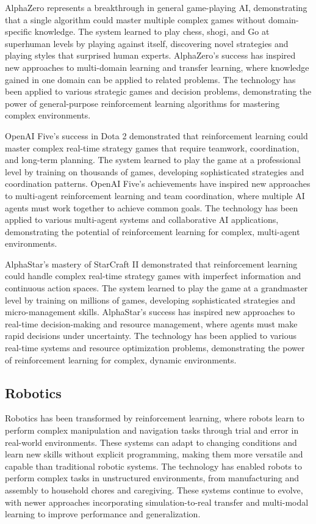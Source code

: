 AlphaZero represents a breakthrough in general game-playing AI, demonstrating that a single algorithm could master multiple complex games without domain-specific knowledge. The system learned to play chess, shogi, and Go at superhuman levels by playing against itself, discovering novel strategies and playing styles that surprised human experts. AlphaZero's success has inspired new approaches to multi-domain learning and transfer learning, where knowledge gained in one domain can be applied to related problems. The technology has been applied to various strategic games and decision problems, demonstrating the power of general-purpose reinforcement learning algorithms for mastering complex environments.

OpenAI Five's success in Dota 2 demonstrated that reinforcement learning could master complex real-time strategy games that require teamwork, coordination, and long-term planning. The system learned to play the game at a professional level by training on thousands of games, developing sophisticated strategies and coordination patterns. OpenAI Five's achievements have inspired new approaches to multi-agent reinforcement learning and team coordination, where multiple AI agents must work together to achieve common goals. The technology has been applied to various multi-agent systems and collaborative AI applications, demonstrating the potential of reinforcement learning for complex, multi-agent environments.

AlphaStar's mastery of StarCraft II demonstrated that reinforcement learning could handle complex real-time strategy games with imperfect information and continuous action spaces. The system learned to play the game at a grandmaster level by training on millions of games, developing sophisticated strategies and micro-management skills. AlphaStar's success has inspired new approaches to real-time decision-making and resource management, where agents must make rapid decisions under uncertainty. The technology has been applied to various real-time systems and resource optimization problems, demonstrating the power of reinforcement learning for complex, dynamic environments.

\subsection{Robotics}

Robotics has been transformed by reinforcement learning, where robots learn to perform complex manipulation and navigation tasks through trial and error in real-world environments. These systems can adapt to changing conditions and learn new skills without explicit programming, making them more versatile and capable than traditional robotic systems. The technology has enabled robots to perform complex tasks in unstructured environments, from manufacturing and assembly to household chores and caregiving. These systems continue to evolve, with newer approaches incorporating simulation-to-real transfer and multi-modal learning to improve performance and generalization.


